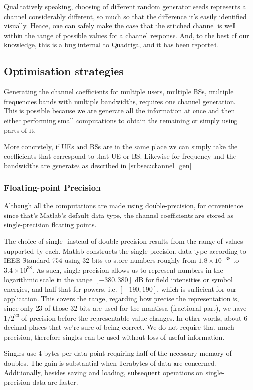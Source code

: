 

Qualitatively speaking, choosing of different random generator seeds represents a channel considerably different, so much so that the difference it's easily identified visually. Hence, one can safely make the case that the stitched channel is well within the range of possible values for a channel response. And, to the best of our knowledge, this is a bug internal to Quadriga, and it has been reported.

\subsection{Optimisation strategies} \label{optimisation_strats}

Generating the channel coefficients for multiple users, multiple BSs, multiple frequencies bands with multiple bandwidths, requires one channel generation. This is possible because we are generate all the information at once and then either performing small computations to obtain the remaining or simply using parts of it. 

More concretely, if \acsp{UE} and \acsp{BS} are in the same place we can simply take the coefficients that correspond to that \acs{UE} or \acs{BS}. Likewise for frequency and the bandwidths are generates as described in \ref{subsec:channel_gen}


\subsubsection*{Floating-point Precision}
Although all the computations are made using double-precision, for convenience since that's Matlab's default data type, the channel coefficients are stored as single-precision floating points.

The choice of single- instead of double-precision results from the range of values supported by each. Matlab constructs the single-precision data type according to IEEE Standard 754 using 32 bits to store numbers roughly from $1.8 \times 10^{-38}$ to $3.4 \times 10^{38}$. As such, single-precision allows us to represent numbers in the logarithmic scale in the range $\left[-380, 380\right]$ dB for field intensities or symbol energies, and half that for powers, i.e. $\left[-190, 190\right]$, which is sufficient for our application. This covers the range, regarding how precise the representation is, since only 23 of those 32 bits are used for the mantissa (fractional part), we have $1 / 2^23$ of precision before the representable value changes. In other words, about 6 decimal places that we're sure of being correct. We do not require that much precision, therefore singles can be used without loss of useful information.

Singles use 4 bytes per data point requiring half of the necessary memory of doubles. The gain is substantial when Terabytes of data are concerned. Additionally, besides saving and loading, subsequent operations on single-precision data are faster.